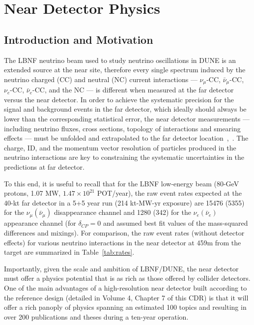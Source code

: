 
\chapter{Near Detector Physics}
\label{ch:physics-nd}

\section{Introduction and Motivation}
\label{sec:physics-nd-introduction}

The LBNF neutrino beam used to study neutrino oscillations in DUNE is
an extended source at the near site, therefore every single spectrum
induced by the neutrino charged (CC) and neutral (NC) current
interactions --- $\nu_\mu$-CC, $\bar \nu_\mu$-CC, $\nu_e$-CC, $\bar
\nu_e$-CC, and the NC --- is different when measured at the far
detector versus the near detector.  In order to achieve the systematic
precision for the signal and background events in the far detector,
which ideally should always be lower than the corresponding
statistical error, the near detector measurements --- including
neutrino fluxes, cross sections, topology of interactions and smearing
effects --- must be unfolded and extrapolated to the far detector
location~\cite{near-detector-REQ1},~\cite{near-detector-REQ2}.  The
charge, ID, and the momentum vector resolution of particles produced
in the neutrino interactions are %
key to constraining the systematic uncertainties in the predictions at
far detector.
%

To this end, it is useful to recall that for the LBNF low-energy beam 
(80-GeV protons, 1.07 MW, $1.47 \times 10^{21} $ POT/year), the raw event rates expected at the  
40-kt far detector in a 5+5 year run (214 kt-MW-yr exposure) are 15476 (5355) for 
the $\nu_\mu (\bar \nu_\mu)$ disappearance channel 
and 1280 (342) for the $\nu_e(\bar \nu_e)$ appearance channel (for $\delta_{CP}=0$ and assumed 
best fit values of the mass-squared differences and mixings). For comparison, the raw event rates (without detector effects) for various neutrino interactions in the near detector at 459m from the target are summarized in Table~\ref{tab:rates}.




Importantly, given the scale and ambition of LBNF/DUNE, the near detector must offer a physics 
potential that is as rich as those offered by collider detectors. 
One of the main advantages of a high-resolution near detector built according to the reference design 
(detailed in Volume 4, Chapter 7 of  this CDR) is that it will offer a rich panoply of physics %
spanning an estimated 100 topics and  resulting in over 200 publications and theses during a ten-year operation. 

